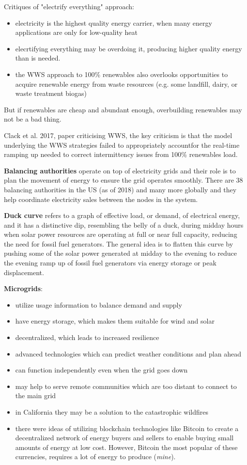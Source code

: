Critiques of "electrify everything" approach:

\begin{itemize}
	\item electricity is the highest quality energy carrier, when many
	energy applications are only for low-quality heat
	\item elecrtifying everything may be overdoing it, producing higher
	quality energy than is needed.
	\item the WWS approach to 100\% renewables also overlooks opportunities
	to acquire renewable energy from waste resources (e.g. some landfill,
	dairy, or waste treatment biogas)
\end{itemize}

But if renewables are cheap and abundant enough, overbuilding renewables may
not be a bad thing.

Clack et al. 2017, paper criticising WWS, the key criticism is that the model
underlying the WWS strategies failed to appropriately accountfor the real-time
ramping up needed to correct intermittency issues from 100\% renewables load.

\textbf{Balancing authorities} operate on top of electricity grids and their
role is to plan the movement of energy to ensure the grid operates smoothly.
There are 38 balancing authorities in the US (as of 2018) and many more
globally and they help coordinate electricity sales between the nodes in the
system.

\textbf{Duck curve} refers to a graph of effective load, or demand, of
electrical energy, and it has a distinctive dip, resembling the belly of a
duck, during midday hours when solar power resources are operating at full or
near full capacity, reducing the need for fossil fuel generators.
The general idea is to flatten this curve by pushing some of the solar power
generated at midday to the evening to reduce the evening ramp up of fossil fuel
generators via energy storage or peak displacement.

\textbf{Microgrids}:
\begin{itemize}
	\item utilize usage information to balance demand and supply
	\item have energy storage, which makes them suitable for wind and solar
	\item decentralized, which leads to increased resilience
	\item advanced technologies which can predict weather conditions and
	plan ahead
	\item can function independently even when the grid goes down
	\item may help to serve remote communities which are too distant to
	connect to the main grid
	\item in California they may be a solution to the catastrophic
	wildfires
	\item there were ideas of utilizing blockchain technologies like
	Bitcoin to create a decentralized network of energy buyers and sellers
	to enable buying small amounts of energy at low cost. However, Bitcoin
	the most popular of these currencies, requires a lot of energy to
	produce (\textit{mine}).
\end{itemize}

